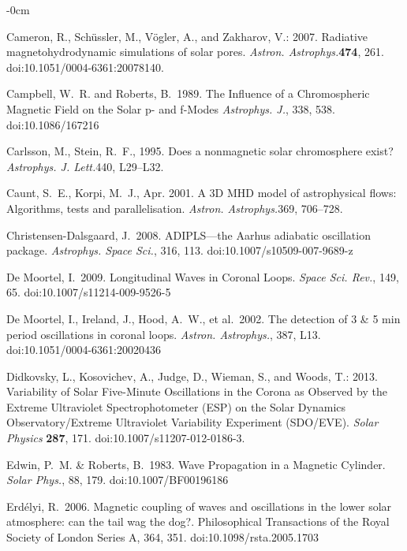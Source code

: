 \documentclass[physics,article,submit,pdftex,moreauthors]{Definitions/mdpi}
\newcommand{\aap}{{\it Astron. Astrophys.}}
\newcommand{\apj}{{\it Astrophys. J.}}
\newcommand{\apjl}{{\it Astrophys. J. Lett.}}
\newcommand{\apss}{{\it Astrophys. Space Sci.}}
\newcommand{\solphys}{{\it Solar Phys.}}
\newcommand{\ssr}{{\it Space Sci. Rev.}}
\begin{document}
\begin{adjustwidth}{-\extralength}{0cm}
\begin{thebibliography}{999}
Cameron, R., Sch{\"u}ssler, M., V{\"o}gler, A., and Zakharov, V.: 2007. {Radiative magnetohydrodynamic simulations of solar pores}. \aap {\bf 474}, 261. doi:10.1051/0004-6361:20078140.

 {Campbell}, W.~R. and {Roberts}, B.\ 1989. {The Influence of a Chromospheric Magnetic Field on the Solar p- and f-Modes} \apj, 338, 538. doi:10.1086/167216

{Carlsson}, M., {Stein}, R.~F., 1995. {Does a nonmagnetic solar chromosphere
  exist?} \apjl 440, L29--L32.

{Caunt}, S.~E., {Korpi}, M.~J., Apr. 2001. A {3D} {MHD} model of astrophysical
  flows: Algorithms, tests and parallelisation. \aap 369, 706--728.

 Christensen-Dalsgaard, J.\ 2008. {ADIPLS—the Aarhus adiabatic oscillation package}. \apss, 316, 113. doi:10.1007/s10509-007-9689-z

 De Moortel, I.\ 2009. {Longitudinal Waves in Coronal Loops}. \ssr, 149, 65. doi:10.1007/s11214-009-9526-5

 De Moortel, I., Ireland, J., Hood, A.~W., et al.\ 2002. {The detection of 3 \& 5 min period oscillations in coronal loops}. \aap, 387, L13. doi:10.1051/0004-6361:20020436

 Didkovsky, L., Kosovichev, A., Judge, D., Wieman, S., and Woods, T.: 2013. {Variability of Solar Five-Minute Oscillations in the Corona as Observed by the Extreme Ultraviolet Spectrophotometer (ESP) on the Solar Dynamics Observatory/Extreme Ultraviolet Variability Experiment (SDO/EVE)}. {\it Solar Physics} {\bf 287}, 171. doi:10.1007/s11207-012-0186-3.


 Edwin, P.~M. \& Roberts, B.\ 1983. {Wave Propagation in a Magnetic Cylinder}. \solphys, 88, 179. doi:10.1007/BF00196186

 Erd{\'e}lyi, R.\ 2006. {Magnetic coupling of waves and oscillations in the lower solar atmosphere: can the tail wag the dog?}. Philosophical Transactions of the Royal Society of London Series A, 364, 351. doi:10.1098/rsta.2005.1703


\end{thebibliography}
\end{adjustwidth}
\end{document}
